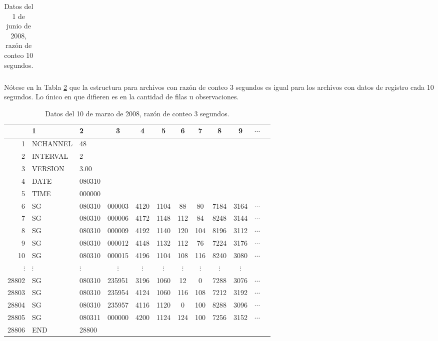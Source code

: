 \begin{table}[H]
\begin{tabular}{r|llccccccccc}
\end{tabular} 
\caption{Datos del 1 de junio de 2008, razón de conteo 10 segundos.}
\label{10seg}       
\end{table}

Nótese en la Tabla \ref{3seg} que la estructura para archivos con razón de conteo 3 segundos es igual para los archivos con datos de registro cada 10 segundos. Lo único en que difieren es en la cantidad de filas u observaciones.


\begin{table}[H]
  \centering
\begin{tabular}{r|llccccccccc}
  & 1 & 2 & 3 & 4 & 5 & 6 & 7 & 8 & 9  & $\cdots$\\
\hline

 1 & NCHANNEL &         48 &        &      &     &   &    &  &  &      \\

 2 & INTERVAL &         2 &        &        &      &      &    &  & &   \\

 3 & VERSION &       3.00 &        &       &       &      &     &  & &       \\

 4 & DATE &      080310 &        &         &       &      &    &    & &      \\

 5  & TIME &      000000 &        &        &       &      &   &   & &       \\

  6 & SG & 080310 & 000003 & 4120 & 1104 &  88 &  80 & 7184 & 3164 &$\cdots$ \\ 
  7 & SG & 080310 & 000006 & 4172 & 1148 & 112 &  84 & 8248 & 3144 &$\cdots$\\ 
  8 & SG & 080310 & 000009 & 4192 & 1140 & 120 & 104 & 8196 & 3112 &$\cdots$\\ 
  9 & SG & 080310 & 000012 & 4148 & 1132 & 112 &  76 & 7224 & 3176 &$\cdots$\\ 
  10& SG & 080310 & 000015 & 4196 & 1104 & 108 & 116 & 8240 & 3080 &$\cdots$\\ 
  $\vdots$ & $\vdots$ & $\vdots$ & $\vdots$ & $\vdots$ & $\vdots$  & $\vdots$ & $\vdots$ & $\vdots$ & $\vdots$ &  \\ 
  28802 & SG & 080310 & 235951 & 3196 & 1060 &  12 &   0 & 7288 & 3076 &$\cdots$\\ 
  28803 & SG & 080310 & 235954 & 4124 & 1060 & 116 & 108 & 7212 & 3192 &$\cdots$\\ 
  28804 & SG & 080310 & 235957 & 4116 & 1120 &   0 & 100 & 8288 & 3096 &$\cdots$\\ 
  28805 & SG & 080311 & 000000 & 4200 & 1124 & 124 & 100 & 7256 & 3152 &$\cdots$\\ 
  28806 & END & 28800 &  &  &  &  &  &  & &  \\ 

\end{tabular} 
\caption{Datos del 10 de marzo de 2008, razón de conteo 3 segundos.}
\label{3seg}       
\end{table}

